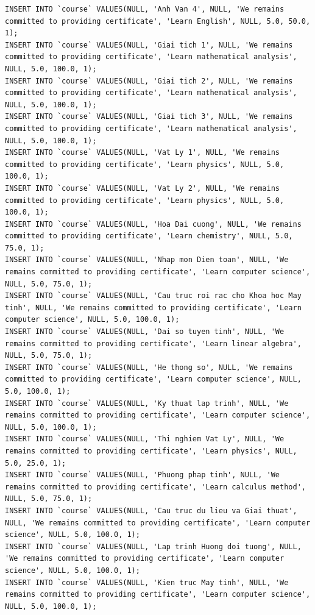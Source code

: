 \documentclass[12pt,a4paper,titlepage]{article}
\begin{document}
\begin{lstlisting}
INSERT INTO `course` VALUES(NULL, 'Anh Van 4', NULL, 'We remains committed to providing certificate', 'Learn English', NULL, 5.0, 50.0, 1);
INSERT INTO `course` VALUES(NULL, 'Giai tich 1', NULL, 'We remains committed to providing certificate', 'Learn mathematical analysis', NULL, 5.0, 100.0, 1);
INSERT INTO `course` VALUES(NULL, 'Giai tich 2', NULL, 'We remains committed to providing certificate', 'Learn mathematical analysis', NULL, 5.0, 100.0, 1);
INSERT INTO `course` VALUES(NULL, 'Giai tich 3', NULL, 'We remains committed to providing certificate', 'Learn mathematical analysis', NULL, 5.0, 100.0, 1);
INSERT INTO `course` VALUES(NULL, 'Vat Ly 1', NULL, 'We remains committed to providing certificate', 'Learn physics', NULL, 5.0, 100.0, 1);
INSERT INTO `course` VALUES(NULL, 'Vat Ly 2', NULL, 'We remains committed to providing certificate', 'Learn physics', NULL, 5.0, 100.0, 1);
INSERT INTO `course` VALUES(NULL, 'Hoa Dai cuong', NULL, 'We remains committed to providing certificate', 'Learn chemistry', NULL, 5.0, 75.0, 1);
INSERT INTO `course` VALUES(NULL, 'Nhap mon Dien toan', NULL, 'We remains committed to providing certificate', 'Learn computer science', NULL, 5.0, 75.0, 1);
INSERT INTO `course` VALUES(NULL, 'Cau truc roi rac cho Khoa hoc May tinh', NULL, 'We remains committed to providing certificate', 'Learn computer science', NULL, 5.0, 100.0, 1);
INSERT INTO `course` VALUES(NULL, 'Dai so tuyen tinh', NULL, 'We remains committed to providing certificate', 'Learn linear algebra', NULL, 5.0, 75.0, 1);
INSERT INTO `course` VALUES(NULL, 'He thong so', NULL, 'We remains committed to providing certificate', 'Learn computer science', NULL, 5.0, 100.0, 1);
INSERT INTO `course` VALUES(NULL, 'Ky thuat lap trinh', NULL, 'We remains committed to providing certificate', 'Learn computer science', NULL, 5.0, 100.0, 1);
INSERT INTO `course` VALUES(NULL, 'Thi nghiem Vat Ly', NULL, 'We remains committed to providing certificate', 'Learn physics', NULL, 5.0, 25.0, 1);
INSERT INTO `course` VALUES(NULL, 'Phuong phap tinh', NULL, 'We remains committed to providing certificate', 'Learn calculus method', NULL, 5.0, 75.0, 1);
INSERT INTO `course` VALUES(NULL, 'Cau truc du lieu va Giai thuat', NULL, 'We remains committed to providing certificate', 'Learn computer science', NULL, 5.0, 100.0, 1);
INSERT INTO `course` VALUES(NULL, 'Lap trinh Huong doi tuong', NULL, 'We remains committed to providing certificate', 'Learn computer science', NULL, 5.0, 100.0, 1);
INSERT INTO `course` VALUES(NULL, 'Kien truc May tinh', NULL, 'We remains committed to providing certificate', 'Learn computer science', NULL, 5.0, 100.0, 1);

\end{lstlisting}
\end{document}
